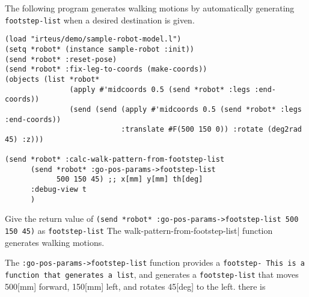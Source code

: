 The following program generates walking motions by automatically generating \verb|footstep-list| when a desired destination is given.
{\baselineskip=10pt
\begin{verbatim}
(load "irteus/demo/sample-robot-model.l")
(setq *robot* (instance sample-robot :init))
(send *robot* :reset-pose)
(send *robot* :fix-leg-to-coords (make-coords))
(objects (list *robot*
               (apply #'midcoords 0.5 (send *robot* :legs :end-coords))
               (send (send (apply #'midcoords 0.5 (send *robot* :legs :end-coords))
                           :translate #F(500 150 0)) :rotate (deg2rad 45) :z)))

(send *robot* :calc-walk-pattern-from-footstep-list
      (send *robot* :go-pos-params->footstep-list
            500 150 45) ;; x[mm] y[mm] th[deg]
      :debug-view t
      )
\end{verbatim}
}
Give the return value of \verb|(send *robot* :go-pos-params->footstep-list 500 150 45)| as \verb|footstep-list| The walk-pattern-from-footstep-list| function generates walking motions.

The \verb|:go-pos-params->footstep-list| function provides a \verb|footstep- This is a function that generates a list|, and generates a \verb|footstep-list| that moves 500[mm] forward, 150[mm] left, and rotates 45[deg] to the left. there is

  
